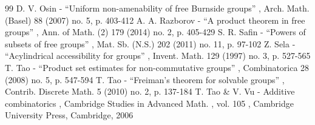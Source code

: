 \documentclass[11pt]{article}
\theoremstyle{plain}
\theoremstyle{definition}
\begin{document}
\begin{thebibliography}{99}
 D. V. Osin - “Uniform non-amenability of free Burnside groups” , Arch. Math. (Basel) 88 (2007) no. 5, p. 403-412
 A. A. Razborov - “A product theorem in free groups” , Ann. of Math. (2) 179 (2014) no. 2, p. 405-429
 S. R. Safin - “Powers of subsets of free groups” , Mat. Sb. (N.S.) 202 (2011) no. 11, p. 97-102
 Z. Sela - “Acylindrical accessibility for groups” , Invent. Math. 129 (1997) no. 3, p. 527-565
 T. Tao - “Product set estimates for non-commutative groups” , Combinatorica 28 (2008) no. 5, p. 547-594
 T. Tao - “Freiman’s theorem for solvable groups” , Contrib. Discrete Math. 5 (2010) no. 2, p. 137-184
 T. Tao \& V. Vu - Additive combinatorics , Cambridge Studies in Advanced Math. , vol. 105 , Cambridge University Press, Cambridge, 2006
\end{thebibliography}
\end{document}

